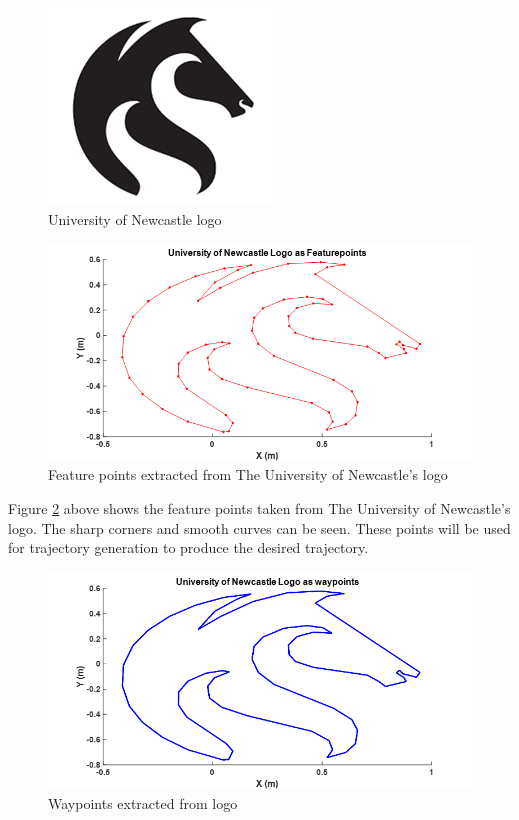 \documentclass{UoNMCHA}
\numberwithin{equation}{section}
\begin{document}
	
	\begin{figure}[H]
		\begin{center}
			\includegraphics[width=.5\linewidth]{figs/Picture21}
			\caption{University of Newcastle logo}
			\label{figs/Picture21}
		\end{center}
	\end{figure}
	
	
	\begin{figure}[H]
		\begin{center}
			\includegraphics[width=.8\linewidth]{figs/Picture22}
			\caption{Feature points extracted from The University of Newcastle's logo}
			\label{figs/Picture22}
		\end{center}
	\end{figure}
	
	Figure \ref{figs/Picture22} above shows the feature points taken from The University of Newcastle's logo. The sharp corners and smooth curves can be seen. These points will be used for trajectory generation to produce the desired trajectory. 
	
	\begin{figure}[H]
		\begin{center}
			\includegraphics[width=.8\linewidth]{figs/Picture23}
			\caption{Waypoints extracted from logo}
			\label{figs/Picture23}
		\end{center}
	\end{figure}
	
\end{document}

